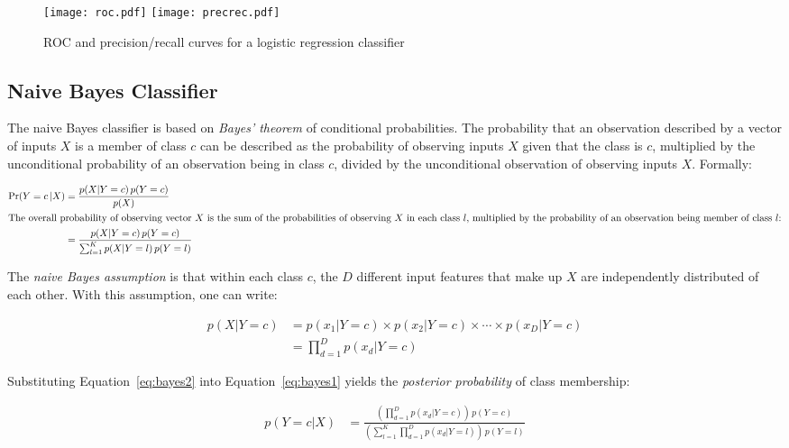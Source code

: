 \begin{figure}
\centering 
\texttt{[image: roc.pdf]}
\texttt{[image: precrec.pdf]}
\caption{ROC and precision/recall curves for a logistic regression classifier}
\label{fig:logregplot}
\end{figure}

\subsection{Naive Bayes Classifier}

The naive Bayes classifier is based on \emph{Bayes' theorem} of conditional probabilities. The probability that an observation described by a vector of inputs $X$ is a member of class $c$ can be described as the probability of observing inputs $X$ given that the class is $c$, multiplied by the unconditional probability of an observation being in class $c$, divided by the unconditional observation of observing inputs $X$. Formally:

\begin{align}
\Pr(Y=c\, | X) &= \frac{p(X|Y=c)\, p(Y=c)}{p(X)} \nonumber \\
\intertext{The overall probability of observing vector $X$ is the sum of the probabilities of observing $X$ in each class $l$, multiplied by the probability of an observation being member of class $l$:}
&= \frac{p(X|Y=c)\,p(Y=c) }{\sum_{l=1}^K p(X|Y=l)\,p(Y=l)}  \label{eq:bayes1}
\end{align}

The \emph{naive Bayes assumption} is that within each class $c$, the $D$ different input features that make up $X$ are independently distributed of each other. With this assumption, one can write:

\begin{align}
p(X | Y=c ) &= p(x_1 | Y=c) \times p(x_2 | Y=c) \times \cdots \times p(x_D | Y=c) \nonumber \\
            &= \prod_{d=1}^D p(x_d | Y=c) \label{eq:bayes2}
\end{align}

\noindent Substituting Equation~\ref{eq:bayes2} into Equation~\ref{eq:bayes1} yields the \emph{posterior probability} of class membership:

\begin{align*}
p(Y=c|X) &= \frac{\left(\prod_{d=1}^D p(x_d | Y=c)\right) \, p(Y=c)}{\left(\sum_{l=1}^K \prod_{d=1}^D p(x_d | Y=l)\right) \, p(Y=l) } 
\end{align*}

